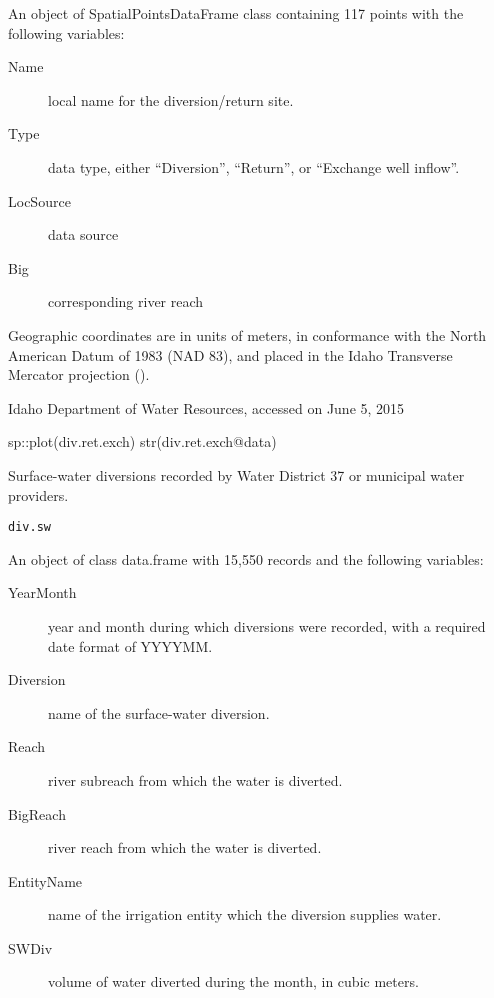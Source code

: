 \documentclass[a4paper]{book}
\begin{document}
\begin{Format}
An object of SpatialPointsDataFrame class containing 117 points with the
following variables:
\begin{description}

\item[Name] local name for the diversion/return site.
\item[Type] data type, either ``Diversion'', ``Return'', or
``Exchange well inflow''.
\item[LocSource] data source
\item[Big] corresponding river reach

\end{description}

Geographic coordinates are in units of meters, in conformance with the
North American Datum of 1983 (NAD 83), and placed in the
Idaho Transverse Mercator projection ().
\end{Format}
%
\begin{Source}\relax
Idaho Department of Water Resources, accessed on June 5, 2015
\end{Source}
%
\begin{Examples}
\begin{ExampleCode}
sp::plot(div.ret.exch)
str(div.ret.exch@data)

\end{ExampleCode}
\end{Examples}
%
\begin{Description}\relax
Surface-water diversions recorded by Water District 37 or municipal water providers.
\end{Description}
%
\begin{Usage}
\begin{verbatim}
div.sw
\end{verbatim}
\end{Usage}
%
\begin{Format}
An object of class data.frame with 15,550 records and the following variables:
\begin{description}

\item[YearMonth] year and month during which diversions were recorded,
with a required date format of YYYYMM.
\item[Diversion] name of the surface-water diversion.
\item[Reach] river subreach from which the water is diverted.
\item[BigReach] river reach from which the water is diverted.
\item[EntityName] name of the irrigation entity which the diversion supplies water.
\item[SWDiv] volume of water diverted during the month, in cubic meters.

\end{description}
\end{Format}
\end{document}
